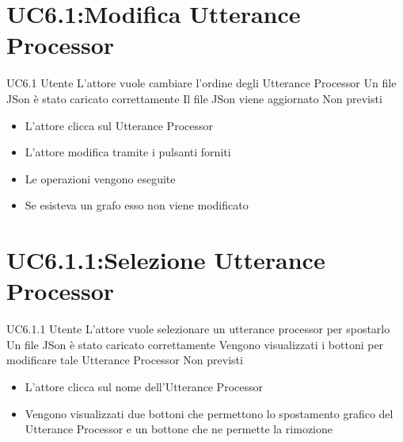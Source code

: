 \documentclass[../AnalisideiRequisiti.tex]{subfiles}
\begin{document}
\section{UC6.1:Modifica Utterance Processor}
\UserCase
{UC6.1}
{Utente}
{}
{L'attore vuole cambiare l'ordine degli Utterance Processor}
{Un file JSon è stato caricato  correttamente }
{Il file JSon viene aggiornato}
{Non previsti}
{
	\begin{itemize}
		\item{} L'attore clicca sul Utterance Processor 
		\item{} L'attore modifica tramite i pulsanti forniti	
		\item{} Le operazioni vengono eseguite
		\item{} Se esisteva un grafo esso non viene modificato
		
	\end{itemize}
}
\section{UC6.1.1:Selezione Utterance Processor}
\UserCase
{UC6.1.1}
{Utente}
{}
{L'attore vuole selezionare un utterance processor per spostarlo}
{Un file JSon è stato caricato  correttamente }
{Vengono visualizzati i bottoni per modificare tale Utterance Processor}
{Non previsti}
{
	\begin{itemize}
		\item{} L'attore clicca sul nome dell'Utterance Processor
		\item{} Vengono visualizzati due bottoni che permettono lo spostamento grafico del Utterance Processor e un bottone che ne permette la rimozione 
		
		
	\end{itemize}
}
\end{document}
